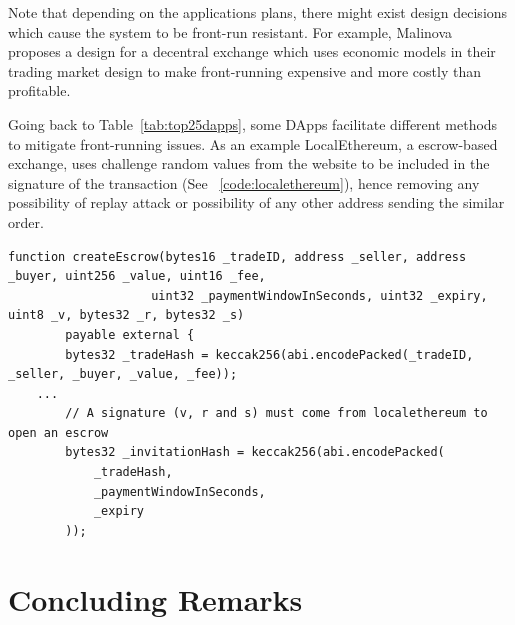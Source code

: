 
Note that depending on the applications plans, there might exist design decisions which cause the system to be front-run resistant. For example, Malinova~\cite{Malinova} proposes a design for a decentral exchange which uses economic models in their trading market design to make front-running expensive and more costly than profitable.

Going back to Table~\ref{tab:top25dapps}, some DApps facilitate different methods to mitigate front-running issues. As an example LocalEthereum, a escrow-based exchange, uses challenge random values from the website to be included in the signature of the transaction (See ~\ref{code:localethereum}), hence removing any possibility of replay attack or possibility of any other address sending the similar order.

\begin{lstlisting}[basicstyle=\scriptsize\ttfamily,caption={Code snippet from LocalEthereum smart contract. Values V,R and S are set by LocalEtherem to have a valid signature, also the tradeHash uses buyer and seller addresses, mitigating the possibility of front-running by a third party.},label={code:localethereum},float]
    function createEscrow(bytes16 _tradeID, address _seller, address _buyer, uint256 _value, uint16 _fee,
					uint32 _paymentWindowInSeconds, uint32 _expiry, uint8 _v, bytes32 _r, bytes32 _s) 
        payable external {
        bytes32 _tradeHash = keccak256(abi.encodePacked(_tradeID, _seller, _buyer, _value, _fee));
	...
        // A signature (v, r and s) must come from localethereum to open an escrow
        bytes32 _invitationHash = keccak256(abi.encodePacked(
            _tradeHash,
            _paymentWindowInSeconds,
            _expiry
        )); 
\end{lstlisting}







\section{Concluding Remarks}





